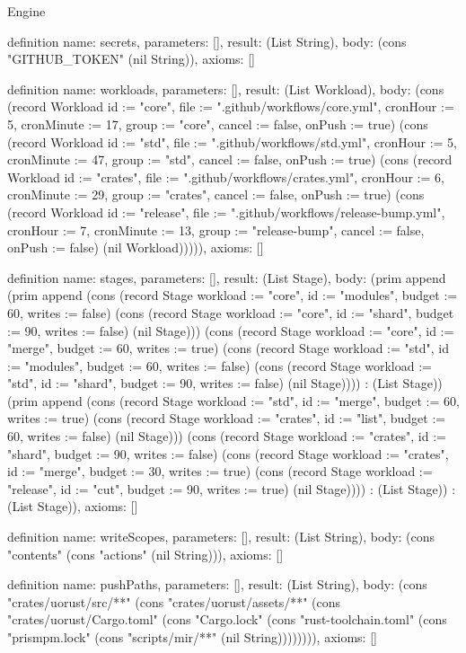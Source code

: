 \begin{lexlean}{Engine}
\begin{semanticmodule}
definition{
  name: secrets,
  parameters: [],
  result: (List String),
  body: (cons "GITHUB_TOKEN" (nil String)),
  axioms: []
}

definition{
  name: workloads,
  parameters: [],
  result: (List Workload),
  body: (cons (record Workload {id := "core", file := ".github/workflows/core.yml", cronHour := 5, cronMinute := 17, group := "core", cancel := false, onPush := true}) (cons (record Workload {id := "std", file := ".github/workflows/std.yml", cronHour := 5, cronMinute := 47, group := "std", cancel := false, onPush := true}) (cons (record Workload {id := "crates", file := ".github/workflows/crates.yml", cronHour := 6, cronMinute := 29, group := "crates", cancel := false, onPush := true}) (cons (record Workload {id := "release", file := ".github/workflows/release-bump.yml", cronHour := 7, cronMinute := 13, group := "release-bump", cancel := false, onPush := false}) (nil Workload))))),
  axioms: []
}

definition{
  name: stages,
  parameters: [],
  result: (List Stage),
  body: (prim append (prim append (cons (record Stage {workload := "core", id := "modules", budget := 60, writes := false}) (cons (record Stage {workload := "core", id := "shard", budget := 90, writes := false}) (nil Stage))) (cons (record Stage {workload := "core", id := "merge", budget := 60, writes := true}) (cons (record Stage {workload := "std", id := "modules", budget := 60, writes := false}) (cons (record Stage {workload := "std", id := "shard", budget := 90, writes := false}) (nil Stage)))) : (List Stage)) (prim append (cons (record Stage {workload := "std", id := "merge", budget := 60, writes := true}) (cons (record Stage {workload := "crates", id := "list", budget := 60, writes := false}) (nil Stage))) (cons (record Stage {workload := "crates", id := "shard", budget := 90, writes := false}) (cons (record Stage {workload := "crates", id := "merge", budget := 30, writes := true}) (cons (record Stage {workload := "release", id := "cut", budget := 90, writes := true}) (nil Stage)))) : (List Stage)) : (List Stage)),
  axioms: []
}

definition{
  name: writeScopes,
  parameters: [],
  result: (List String),
  body: (cons "contents" (cons "actions" (nil String))),
  axioms: []
}

definition{
  name: pushPaths,
  parameters: [],
  result: (List String),
  body: (cons "crates/uorust/src/**" (cons "crates/uorust/assets/**" (cons "crates/uorust/Cargo.toml" (cons "Cargo.lock" (cons "rust-toolchain.toml" (cons "prismpm.lock" (cons "scripts/mir/**" (nil String)))))))),
  axioms: []
}


\end{semanticmodule}
\end{lexlean}
